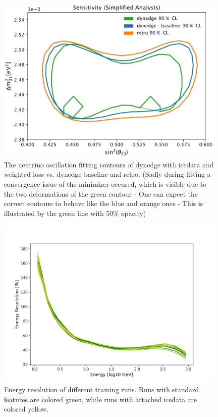 \documentclass[a4paper,10pt]{scrartcl}
\begin{document}
\begin{figure}[H]
    \includegraphics[scale=0.7]{images/2d_contour_test_fixed.pdf}
    \centering
    \caption{
        The neutrino oscillation fitting contours of dynedge with icedata and weighted loss vs. dynedge baseline and retro.
        (Sadly during fitting a convergence issue of the minimizer occured, which is visible due to the two deformations of the green contour -
        One can expect the correct contours to behave like the blue and orange ones - This is illustrated by the green line with 50\% opacity)
    }
    \label{fig:contour}
\end{figure}

\newpage

\begin{figure}[h]
    \includegraphics[scale=0.65]{images/results-icedata.png}
    \centering
    \caption{Energy resolution of different training runs. Runs with standard features are colored green, while runs with attached icedata are colored yellow.}
    \label{fig:results-icedata}
\end{figure}
\end{document}
